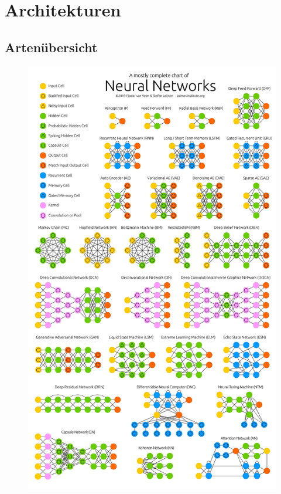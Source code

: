 \section{Architekturen}

\subsection{Artenübersicht}

\begin{figure}[!htb]
	\centering
	\includegraphics[width=.7\linewidth]{img/architektur_uebersicht}
	\label{fig:arch_arten}
\end{figure}
